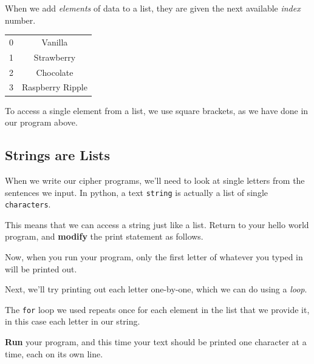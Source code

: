 		\begin{aside}[Lists]
			When we add \textit{elements} of data to a list, they are given the next available \textit{index} number.
			
			\vspace{4pt}
			\begin{tabular}{c|c}
				0 & Vanilla \\ 
				1 & Strawberry \\ 
				2 & Chocolate \\ 
				3 & Raspberry Ripple
			\end{tabular} 
			\vspace{4pt}
						
			To access a single element from a list, we use square brackets, as we have done in our program above.
		\end{aside}
	
	\subsection*{Strings are Lists}
	
		When we write our cipher programs, we'll need to look at single letters from the sentences we input. In python, a text \texttt{string} is actually a list of single \texttt{characters}.
		
		This means that we can access a string just like a list. Return to your hello world program, and \textbf{modify} the print statement as follows.
	
		\textbf{}
		
		Now, when you run your program, only the first letter of whatever you typed in will be printed out.
		
		Next, we'll try printing out each letter one-by-one, which we can do using a \textit{loop}.
		
		\textbf{}
		
		The \texttt{for} loop we used repeats once for each element in the list that we provide it, in this case each letter in our string.
		
		\textbf{Run} your program, and this time your text should be printed one character at a time, each on its own line.
		